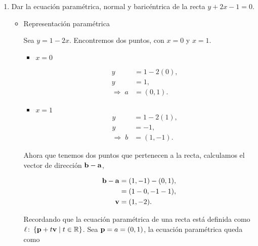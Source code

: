 \documentclass{article}
\theoremstyle{definicion}
\theoremstyle{definition}             %
\theoremstyle{definition}             %
\theoremstyle{definition}
\theoremstyle{definition}
\theoremstyle{observacion}
\theoremstyle{definition}
\theoremstyle{plain}
\theoremstyle{definition}
\theoremstyle{afirmacion}
\theoremstyle{notation}
\theoremstyle{definition}
\begin{document}
        \begin{enumerate}
            \item Dar la ecuación paramétrica, normal y baricéntrica de la recta \(y + 2x -1 = 0\).
            
            \begin{itemize}
                \item Representación paramétrica
                
                Sea \(y = 1 -2x\). Encontremos dos puntos, con \(x = 0\) y \(x = 1\).
                
                \begin{itemize}
                    \item \(x = 0\)
                    
                    \begin{align*}
                        y &= 1 - 2(0),\\
                        y &= 1,\\
                        \Rightarrow\; a &= (0, 1).
                    \end{align*}

                    \item \(x = 1\)
                        \begin{align*}
                            y &= 1 - 2(1),\\
                            y &= -1,\\
                            \Rightarrow\; b &= (1, -1).
                        \end{align*}
                \end{itemize}

                Ahora que tenemos dos puntos que pertenecen a la recta, calculamos el vector de dirección \(\vb{b} - \vb{a}\),

                \begin{align*}
                    \vb{b} - \vb{a} &= (1, -1) - (0, 1),\\
                                    &= (1 - 0, -1 - 1),\\
                    \vb{v}          &= (1, -2). 
                \end{align*}

                Recordando que la ecuación paramétrica de una recta está definida como \(\ell \colon \left\lbrace \vb{p} + t\vb{v} \mid t \in \mathbb{R}\right\rbrace\). Sea \(\vb{p} = a = (0, 1)\), la ecuación paramétrica queda como


\end{itemize}
\end{enumerate}
\end{document}
